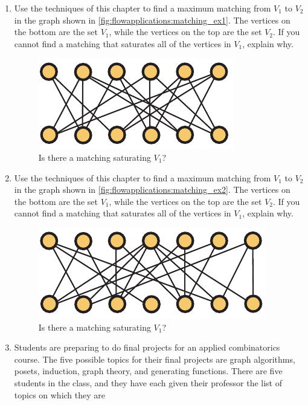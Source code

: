 \begin{enumerate}
\item Use the techniques of this chapter to find a maximum matching
  from $V_1$ to $V_2$ in the graph shown in
  \autoref{fig:flowapplications:matching_ex1}. The vertices on the
  bottom are the set $V_1$, while the vertices on the top are the set
  $V_2$. If you cannot find a matching that saturates all of the
  vertices in $V_1$, explain why.
  \begin{figure}[h]
    \centering
    \includegraphics[scale=0.6]{flowapplications-figs/matching_ex1}
    \caption{Is there a matching saturating $V_1$?}
    \label{fig:flowapplications:matching_ex1}
  \end{figure}
\item Use the techniques of this chapter to find a maximum matching
  from $V_1$ to $V_2$ in the graph shown in
  \autoref{fig:flowapplications:matching_ex2}. The vertices on the
  bottom are the set $V_1$, while the vertices on the top are the set
  $V_2$. If you cannot find a matching that saturates all of the
  vertices in $V_1$, explain why.
  \begin{figure}[h]
    \centering
    \includegraphics[scale=0.6]{flowapplications-figs/matching_ex2}
    \caption{Is there a matching saturating $V_1$?}
    \label{fig:flowapplications:matching_ex2}
  \end{figure}
\item Students are preparing to do final projects for an applied
  combinatorics course. The five possible topics for their final
  projects are graph algorithms, posets, induction, graph theory, and
  generating functions. There are five students in the class, and they
  have each given their professor the list of topics on which they are

\end{enumerate}
